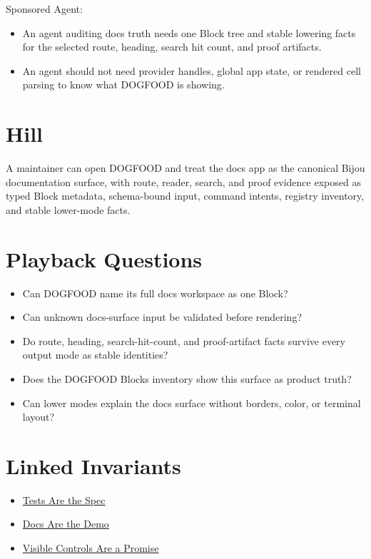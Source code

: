 Sponsored Agent:

\begin{itemize}
\tightlist
\item
  An agent auditing docs truth needs one Block tree and stable lowering facts for the selected route, heading, search hit count, and proof artifacts.
\item
  An agent should not need provider handles, global app state, or rendered cell parsing to know what DOGFOOD is showing.
\end{itemize}

\section{Hill}\label{record-091-hill}

A maintainer can open DOGFOOD and treat the docs app as the canonical Bijou documentation surface, with route, reader, search, and proof evidence exposed as typed Block metadata, schema-bound input, command intents, registry inventory, and stable lower-mode facts.

\section{Playback Questions}\label{record-091-playback-questions}

\begin{itemize}
\tightlist
\item
  Can DOGFOOD name its full docs workspace as one Block?
\item
  Can unknown docs-surface input be validated before rendering?
\item
  Do route, heading, search-hit-count, and proof-artifact facts survive every output mode as stable identities?
\item
  Does the DOGFOOD Blocks inventory show this surface as product truth?
\item
  Can lower modes explain the docs surface without borders, color, or terminal layout?
\end{itemize}

\section{Linked Invariants}\label{record-091-linked-invariants}

\begin{itemize}
\tightlist
\item
  \href{https://github.com/flyingrobots/bijou/blob/cbd70612140e7a450d764b3c7be1c6af878b99bc/docs/invariants/tests-are-the-spec.md}{Tests Are the Spec}
\item
  \href{https://github.com/flyingrobots/bijou/blob/cbd70612140e7a450d764b3c7be1c6af878b99bc/docs/invariants/docs-are-the-demo.md}{Docs Are the Demo}
\item
  \href{https://github.com/flyingrobots/bijou/blob/cbd70612140e7a450d764b3c7be1c6af878b99bc/docs/invariants/visible-controls-are-a-promise.md}{Visible Controls Are a Promise}
\end{itemize}

